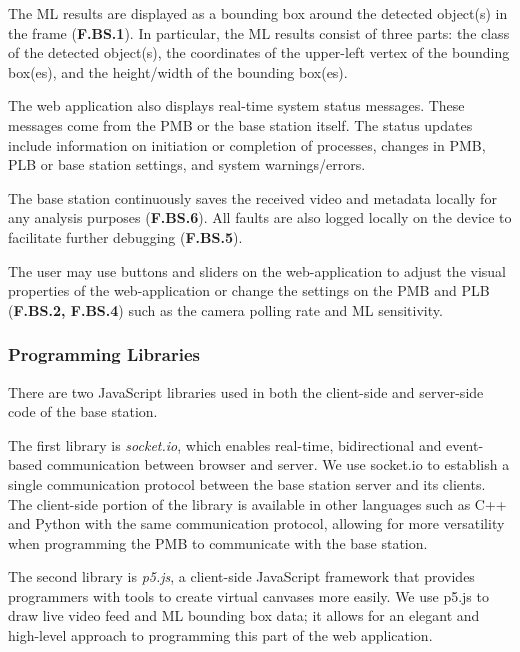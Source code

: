 The ML results are displayed as a bounding box around the detected object(s) in the frame (\textbf{F.BS.1}). In particular, the ML results consist of three parts: the class of the detected object(s), the coordinates of the upper-left vertex of the bounding box(es), and the height/width of the bounding box(es).

The web application also displays real-time system status messages. These messages come from the PMB or the base station itself. The status updates include information on initiation or completion of processes, changes in PMB, PLB or base station settings, and system warnings/errors.

The base station continuously saves the received video and metadata locally for any analysis purposes (\textbf{F.BS.6}). All faults are also logged locally on the device to facilitate further debugging (\textbf{F.BS.5}).

The user may use buttons and sliders on the web-application to adjust the visual properties of the web-application or change the settings on the PMB and PLB (\textbf{F.BS.2, F.BS.4}) such as the camera polling rate and ML sensitivity.

\subsubsection{Programming Libraries}

There are two JavaScript libraries used in both the client-side and server-side code of the base station.

The first library is \textit{socket.io}, which enables real-time, bidirectional and event-based communication between browser and server. We use socket.io to establish a single communication protocol between the base station server and its clients. The client-side portion of the library is available in other languages such as C++ and Python with the same communication protocol, allowing for more versatility when programming the PMB to communicate with the base station. 

The second library is \textit{p5.js}, a client-side JavaScript framework that provides programmers with tools to create virtual canvases more easily. We use p5.js to draw live video feed and ML bounding box data; it allows for an elegant and high-level approach to programming this part of the web application.
